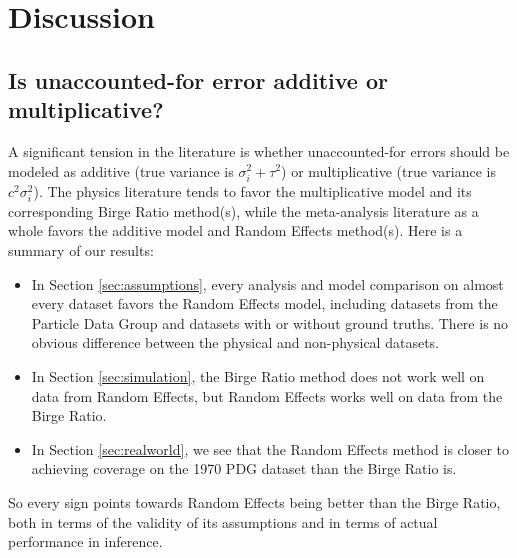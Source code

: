 \documentclass[letterpaper,12pt]{article}
\begin{document}
\section{Discussion}\label{discussion-2}

\subsection{Is unaccounted-for error additive or multiplicative?}
A significant tension in the literature is whether unaccounted-for errors should be modeled as additive (true variance is $\sigma_i^2+\tau^2$) or multiplicative (true variance is $c^2\sigma_i^2$). The physics literature tends to favor the multiplicative model and its corresponding Birge Ratio method(s), while the meta-analysis literature as a whole favors the additive model and Random Effects method(s). Here is a summary of our results:

\begin{itemize}
  \item In Section \ref{sec:assumptions}, every analysis and model comparison on almost every dataset favors the Random Effects model, including datasets from the Particle Data Group and datasets with or without ground truths. There is no obvious difference between the physical and non-physical datasets.
  \item In Section \ref{sec:simulation}, the Birge Ratio method does not work well on data from Random Effects, but Random Effects works well on data from the Birge Ratio.
  \item In Section \ref{sec:realworld}, we see that the Random Effects method is closer to achieving coverage on the 1970 PDG dataset than the Birge Ratio is.
\end{itemize}
So every sign points towards Random Effects being better than the Birge Ratio, both in terms of the validity of its assumptions and in terms of actual performance in inference.
\end{document}
